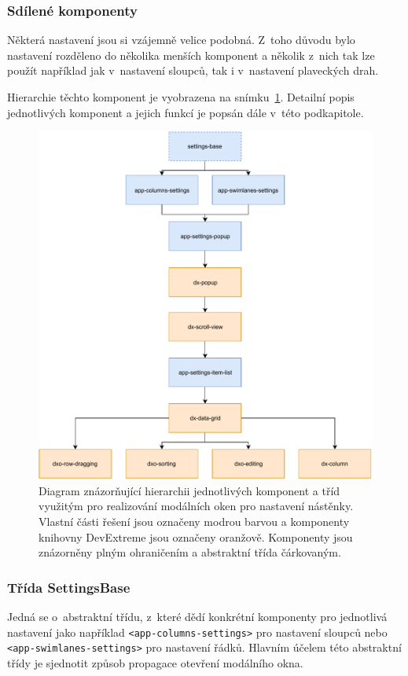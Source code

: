 \subsubsection*{Sdílené komponenty}
Některá nastavení jsou si vzájemně velice podobná. Z~toho důvodu bylo nastavení rozděleno do několika menších komponent a několik z~nich tak lze použít například jak v~nastavení sloupců, tak i v~nastavení plaveckých drah.

Hierarchie těchto komponent je vyobrazena na snímku~\ref{img:settings-dia}. Detailní popis jednotlivých komponent a jejich funkcí je popsán dále v~této podkapitole.

\begin{figure}[H]
	\centering
	\label{img:settings-dia}
	\includegraphics[width=\textwidth]{obrazky-figures/settings-diagram.pdf}
	\caption{Diagram znázorňující hierarchii jednotlivých komponent a tříd využitým pro realizování modálních oken pro nastavení nástěnky. Vlastní části řešení jsou označeny modrou barvou a komponenty knihovny DevExtreme jsou označeny oranžově. Komponenty jsou znázorněny plným ohraničením a abstraktní třída čárkovaným.}
\end{figure}


\subsubsection*{Třída SettingsBase}
Jedná se o~abstraktní třídu, z~které dědí konkrétní komponenty pro jednotlivá nastavení jako například \texttt{<app-columns-settings>} pro nastavení sloupců nebo  \texttt{<app-swimlanes-settings>} pro nastavení řádků. Hlavním účelem této abstraktní třídy je sjednotit způsob propagace otevření modálního okna.


